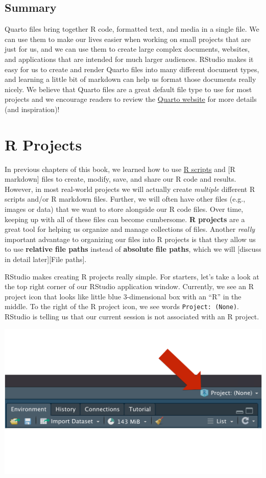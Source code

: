 \documentclass[
  letterpaper,
  DIV=11,
  numbers=noendperiod]{scrreprt}
\begin{document}
\section{Summary}\label{summary-2}

Quarto files bring together R code, formatted text, and media in a
single file. We can use them to make our lives easier when working on
small projects that are just for us, and we can use them to create large
complex documents, websites, and applications that are intended for much
larger audiences. RStudio makes it easy for us to create and render
Quarto files into many different document types, and learning a little
bit of markdown can help us format those documents really nicely. We
believe that Quarto files are a great default file type to use for most
projects and we encourage readers to review the
\href{https://quarto.org/}{Quarto website} for more details (and
inspiration)!

\chapter{R Projects}\label{r-projects}

In previous chapters of this book, we learned how to use
\hyperref[r-scripts]{R scripts} and {[}R markdown{]} files to create,
modify, save, and share our R code and results. However, in most
real-world projects we will actually create \emph{multiple} different R
scripts and/or R markdown files. Further, we will often have other files
(e.g., images or data) that we want to store alongside our R code files.
Over time, keeping up with all of these files can become cumbersome.
\textbf{R projects} are a great tool for helping us organize and manage
collections of files. Another \emph{really} important advantage to
organizing our files into R projects is that they allow us to use
\textbf{relative file paths} instead of \textbf{absolute file paths},
which we will {[}discuss in detail later{]}{[}File paths{]}.

RStudio makes creating R projects really simple. For starters, let's
take a look at the top right corner of our RStudio application window.
Currently, we see an R project icon that looks like little blue
3-dimensional box with an ``R'' in the middle. To the right of the R
project icon, we see words \texttt{Project:\ (None)}. RStudio is telling
us that our current session is not associated with an R project.

\includegraphics{chapters/r_projects/create_01_icon.png}
\end{document}
